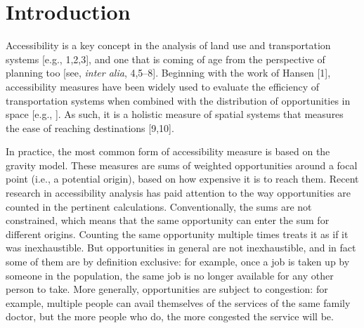 \documentclass[10pt,letterpaper]{article}
\begin{document}

\linenumbers

\hypertarget{introduction}{%
\section{Introduction}\label{introduction}}

Accessibility is a key concept in the analysis of land use and
transportation systems {[}e.g., 1,2,3{]}, and one that is coming of age
from the perspective of planning too {[}see, \emph{inter alia},
4,5--8{]}. Beginning with the work of Hansen {[}1{]}, accessibility
measures have been widely used to evaluate the efficiency of
transportation systems when combined with the distribution of
opportunities in space {[}e.g., {]}. As such, it is a holistic measure
of spatial systems that measures the ease of reaching destinations
{[}9,10{]}.

In practice, the most common form of accessibility measure is based on
the gravity model. These measures are sums of weighted opportunities
around a focal point (i.e., a potential origin), based on how expensive
it is to reach them. Recent research in accessibility analysis has paid
attention to the way opportunities are counted in the pertinent
calculations. Conventionally, the sums are not constrained, which means
that the same opportunity can enter the sum for different origins.
Counting the same opportunity multiple times treats it as if it was
inexhaustible. But opportunities in general are not inexhaustible, and
in fact some of them are by definition exclusive: for example, once a
job is taken up by someone in the population, the same job is no longer
available for any other person to take. More generally, opportunities
are subject to congestion: for example, multiple people can avail
themselves of the services of the same family doctor, but the more
people who do, the more congested the service will be.
\end{document}
